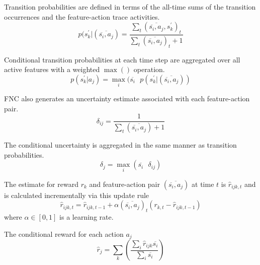 Transition probabilities are defined in terms of the all-time
sums of the transition
occurrences and the feature-action trace activities.
\begin{equation}
p(s^\prime_k | (\overline{\overline{s_i}, a_j}) = \frac
{\sum_t (\overline{\overline{s_i}, a_j}, s^\prime_k)_t}
{\sum_t (\overline{\overline{s_i}, a_j})_t + 1}
\end{equation}

Conditional transition probabilities at each time step are aggregated
over all active features with a weighted $\max()$ operation.
\begin{equation}
p(s^\prime_k | a_j) = \max_i (\overline{s_i} \mbox{ }
p(s^\prime_k | (\overline{\overline{s_i}, a_j}))
\end{equation}

FNC also generates an uncertainty estimate associated with each feature-action
pair.
\begin{equation}
\delta_{ij} = \frac{1}{\sum_t(\overline{\overline{s_i}, a_j}) + 1}
\end{equation}

The conditional uncertainty is aggregated in the same manner as transition
probabilities.
\begin{equation}
\delta_j = \max_i (\overline{s_i} \mbox{ } \delta_{ij})
\end{equation}

The estimate for reward $r_k$ and feature-action pair
$(\overline{\overline{s_i}, a_j})$
at time $t$ is $\hat{r}_{ijk, t}$ and is calculated incrementally via this
update rule
\begin{equation}
\hat{r}_{ijk, t} = \hat{r}_{ijk, t-1} + \alpha
(\overline{\overline{s_i}, a_j})_t
(r_{k,t} - \hat{r}_{ijk, t-1})
\end{equation}
where $\alpha \in [0, 1]$ is a learning rate.

The conditional reward for each action $a_j$
\begin{equation}
\hat{r}_{j} = \sum_k \left ( \frac{\sum_i \hat{r}_{ijk} \overline{s_i}}
{\sum_i \overline{s_i}} \right )
\end{equation}
